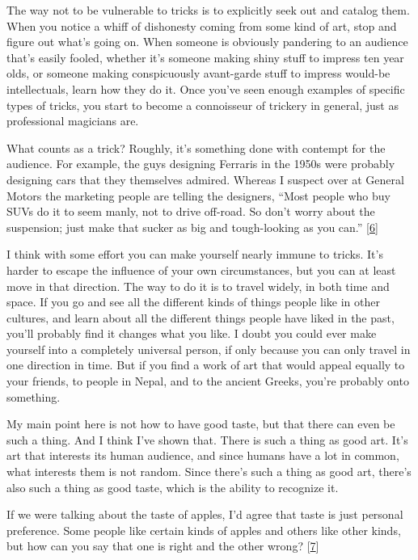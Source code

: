 The way not to be vulnerable to tricks is to explicitly seek out and
catalog them. When you notice a whiff of dishonesty coming from some
kind of art, stop and figure out what's going on. When someone is
obviously pandering to an audience that's easily fooled, whether it's
someone making shiny stuff to impress ten year olds, or someone making
conspicuously avant-garde stuff to impress would-be intellectuals, learn
how they do it. Once you've seen enough examples of specific types of
tricks, you start to become a connoisseur of trickery in general, just
as professional magicians are.

What counts as a trick? Roughly, it's something done with contempt for
the audience. For example, the guys designing Ferraris in the 1950s were
probably designing cars that they themselves admired. Whereas I suspect
over at General Motors the marketing people are telling the designers,
``Most people who buy SUVs do it to seem manly, not to drive off-road.
So don't worry about the suspension; just make that sucker as big and
tough-looking as you can.'' {[}\hyperref[f6n]{6}{]}

I think with some effort you can make yourself nearly immune to tricks.
It's harder to escape the influence of your own circumstances, but you
can at least move in that direction. The way to do it is to travel
widely, in both time and space. If you go and see all the different
kinds of things people like in other cultures, and learn about all the
different things people have liked in the past, you'll probably find it
changes what you like. I doubt you could ever make yourself into a
completely universal person, if only because you can only travel in one
direction in time. But if you find a work of art that would appeal
equally to your friends, to people in Nepal, and to the ancient Greeks,
you're probably onto something.

My main point here is not how to have good taste, but that there can
even be such a thing. And I think I've shown that. There is such a thing
as good art. It's art that interests its human audience, and since
humans have a lot in common, what interests them is not random. Since
there's such a thing as good art, there's also such a thing as good
taste, which is the ability to recognize it.

If we were talking about the taste of apples, I'd agree that taste is
just personal preference. Some people like certain kinds of apples and
others like other kinds, but how can you say that one is right and the
other wrong? {[}\hyperref[f7n]{7}{]}

